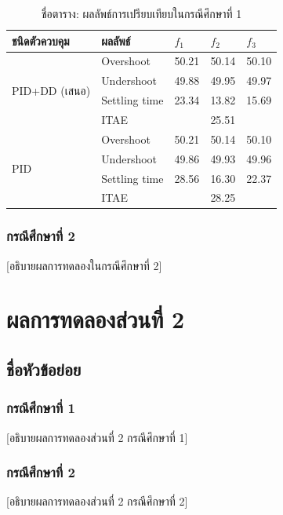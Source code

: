 \begin{table}[htbp]
  \centering
  \caption{ชื่อตาราง: ผลลัพธ์การเปรียบเทียบในกรณีศึกษาที่ 1}
  \label{tab:result_case1}
  \begin{tabular}{lllll}
    \toprule
    ชนิดตัวควบคุม & ผลลัพธ์      & $f_1$  & $f_2$  & $f_3$ \\
    \midrule
    \multirow{4}{*}{PID+DD (เสนอ)}
      & Overshoot    & 50.21  & 50.14  & 50.10 \\
      & Undershoot   & 49.88  & 49.95  & 49.97 \\
      & Settling time & 23.34 & 13.82  & 15.69 \\
      & ITAE         & \multicolumn{3}{c}{25.51} \\
    \midrule
    \multirow{4}{*}{PID}
      & Overshoot    & 50.21  & 50.14  & 50.10 \\
      & Undershoot   & 49.86  & 49.93  & 49.96 \\
      & Settling time & 28.56 & 16.30  & 22.37 \\
      & ITAE         & \multicolumn{3}{c}{28.25} \\
    \bottomrule
  \end{tabular}
\end{table}

\subsubsection{กรณีศึกษาที่ 2}

\noindent\hspace{\parindent}%
[อธิบายผลการทดลองในกรณีศึกษาที่ 2]

\section{ผลการทดลองส่วนที่ 2}

\subsection{ชื่อหัวข้อย่อย}

\subsubsection{กรณีศึกษาที่ 1}

\noindent\hspace{\parindent}%
[อธิบายผลการทดลองส่วนที่ 2 กรณีศึกษาที่ 1]

\subsubsection{กรณีศึกษาที่ 2}

\noindent\hspace{\parindent}%
[อธิบายผลการทดลองส่วนที่ 2 กรณีศึกษาที่ 2]

